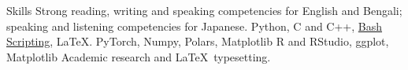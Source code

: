 
\begin{rubric}{Skills}
\entry*[Languages]
	Strong reading, writing and speaking competencies for English and Bengali; speaking and listening competencies for Japanese.
    Python, C and C++, \href{https://github.com/totalblank/dotfiles/tree/working/bash_scripts}{Bash Scripting}, \LaTeX.
    PyTorch, Numpy, Polars, Matplotlib
    R and RStudio, ggplot, Matplotlib
\entry*[Misc.]
	Academic research and \LaTeX\ typesetting.
\end{rubric}
